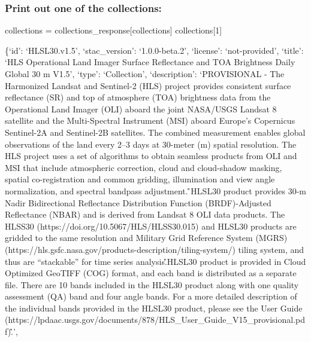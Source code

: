 \documentclass[
  letterpaper,
]{scrartcl}
\newenvironment{Shaded}{}{}
\newcommand{\DecValTok}[1]{\textcolor[rgb]{0.25,0.63,0.44}{#1}}
\newcommand{\NormalTok}[1]{#1}
\newcommand{\OperatorTok}[1]{\textcolor[rgb]{0.40,0.40,0.40}{#1}}
\newcommand{\StringTok}[1]{\textcolor[rgb]{0.25,0.44,0.63}{#1}}
\begin{document}
\hypertarget{print-out-one-of-the-collections}{%
\subsubsection{Print out one of the
collections:}\label{print-out-one-of-the-collections}}

\begin{Shaded}
\begin{Highlighting}[]
\NormalTok{collections }\OperatorTok{=}\NormalTok{ collections\_response[}\StringTok{\textquotesingle{}collections\textquotesingle{}}\NormalTok{]}
\NormalTok{collections[}\DecValTok{1}\NormalTok{]}
\end{Highlighting}
\end{Shaded}

\{`id': `HLSL30.v1.5', `stac\_version': `1.0.0-beta.2', `license':
`not-provided', `title': `HLS Operational Land Imager Surface
Reflectance and TOA Brightness Daily Global 30 m V1.5', `type':
`Collection', `description': `PROVISIONAL - The Harmonized Landsat and
Sentinel-2 (HLS) project provides consistent surface reflectance (SR)
and top of atmosphere (TOA) brightness data from the Operational Land
Imager (OLI) aboard the joint NASA/USGS Landsat 8 satellite and the
Multi-Spectral Instrument (MSI) aboard Europe's Copernicus Sentinel-2A
and Sentinel-2B satellites. The combined measurement enables global
observations of the land every 2--3 days at 30-meter (m) spatial
resolution. The HLS project uses a set of algorithms to obtain seamless
products from OLI and MSI that include atmospheric correction, cloud and
cloud-shadow masking, spatial co-registration and common gridding,
illumination and view angle normalization, and spectral bandpass
adjustment. \r\n\r\nThe HLSL30 product provides 30-m Nadir Bidirectional
Reflectance Distribution Function (BRDF)-Adjusted Reflectance (NBAR) and
is derived from Landsat 8 OLI data products. The HLSS30
(https://doi.org/10.5067/HLS/HLSS30.015) and HLSL30 products are gridded
to the same resolution and Military Grid Reference System (MGRS)
(https://hls.gsfc.nasa.gov/products-description/tiling-system/) tiling
system, and thus are ``stackable'' for time series
analysis.\r\n\r\nThe HLSL30 product is provided in Cloud Optimized
GeoTIFF (COG) format, and each band is distributed as a separate file.
There are 10 bands included in the HLSL30 product along with one quality
assessment (QA) band and four angle bands. For a more detailed
description of the individual bands provided in the HLSL30 product,
please see the User Guide
(https://lpdaac.usgs.gov/documents/878/HLS\_User\_Guide\_V15\_provisional.pdf).\r\n\r\n',
\end{document}
